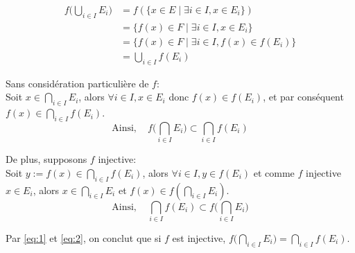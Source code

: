 \documentclass[a4paper, 10pt]{report}
\begin{document}
	\colorbox{solution}
	{\begin{minipage}{0.9\textwidth}
		\[\begin{split}
			f\Big(\bigcup\limits_{i \in I}E_i\Big)
			&= f(\{x \in E \mid \exists i \in I, x \in E_i\})\\
			&= \{f(x) \in F \mid \exists i \in I, x \in E_i\}\\
			&= \{f(x) \in F \mid \exists i \in I, f(x) \in f(E_i)\}\\
			&= \bigcup\limits_{i \in I}f(E_i)
		\end{split}\]
		
		Sans considération particulière de $f$:\\
		Soit $x \in \bigcap\limits_{i \in I}E_i$, alors
		$\forall i \in I, x \in E_i$ donc $f(x) \in f(E_i)$, et par
		conséquent $f(x) \in \bigcap\limits_{i \in I}f(E_i)$.\\
		\begin{equation}\label{eq:1}
			\text{Ainsi},\quad f\Big(\bigcap\limits_{i \in I}E_i\Big)
			\subset \bigcap\limits_{i \in I}f(E_i)
		\end{equation}
			
		De plus, supposons $f$ injective:\\
		Soit $y := f(x) \in \bigcap\limits_{i \in I}f(E_i)$, alors
		$\forall i \in I, y \in f(E_i)$ et comme $f$ injective
		$x \in E_i$, alors $x \in \bigcap\limits_{i \in I}E_i$
		et $f(x) \in f(\bigcap\limits_{i \in I}E_i)$.\\
		\begin{equation}\label{eq:2}
			\text{Ainsi},\quad \bigcap\limits_{i \in I}f(E_i)
			\subset f\Big(\bigcap\limits_{i \in I}E_i\Big)
		\end{equation}
		
		Par \eqref{eq:1} et \eqref{eq:2}, on conclut que si $f$ est
		injective, $\displaystyle f\Big(\bigcap\limits_{i \in I}E_i\Big)
			= \bigcap\limits_{i \in I}f(E_i)$.
		
	\end{minipage}}
	
\end{document}
